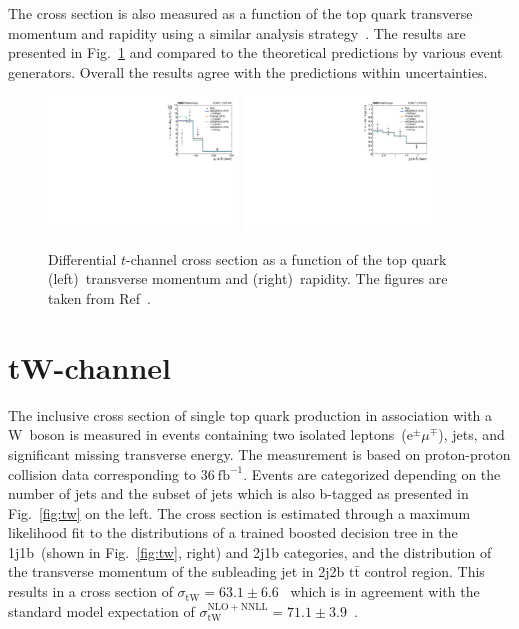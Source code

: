 \documentclass[12pt]{article}
\begin{document}
The cross section is also measured as a function of the top quark transverse momentum and rapidity using a similar analysis strategy~\cite{tchannel-diff}. The results are presented in Fig.~\ref{fig:tchan-diff} and compared to the theoretical predictions by various event generators. Overall the results agree with the predictions within uncertainties.

\begin{figure}[!htb]
\begin{center}
\includegraphics[width=0.45\textwidth]{unfolded_top_pt.pdf}\hspace{0.02\textwidth}
\includegraphics[width=0.45\textwidth]{unfolded_top_y.pdf}
\caption{\label{fig:tchan-diff}Differential $t$-channel cross section as a function of the top quark (left)~transverse momentum and (right)~rapidity. The figures are taken from Ref~\cite{tchannel-diff}.}
\end{center}
\end{figure}


\section{tW-channel}

The inclusive cross section of single top quark production in association with a W~boson is measured in events containing two isolated leptons~($\mathrm{e}^{\pm}\mu^{\mp}$), jets, and significant missing transverse energy. The measurement is based on proton-proton collision data corresponding to $36~\mathrm{fb}^{-1}$. Events are categorized depending on the number of jets and the subset of jets which is also b-tagged as presented in Fig.~\ref{fig:tw} on the left. The cross section is estimated through a maximum likelihood fit to the distributions of a trained boosted decision tree in the 1j1b~(shown in Fig.~\ref{fig:tw}, right) and 2j1b categories, and the distribution of the transverse momentum of the subleading jet in 2j2b $\mathrm{t}\bar{\mathrm{t}}$ control region. This results in a cross section of $\sigma_\mathrm{tW}=63.1\pm6.6$~\cite{tw-inc} which is in agreement with the standard model expectation of $\sigma_\mathrm{tW}^\mathrm{NLO+NNLL}=71.1\pm3.9$~\cite{kidonakis}.
\end{document}
